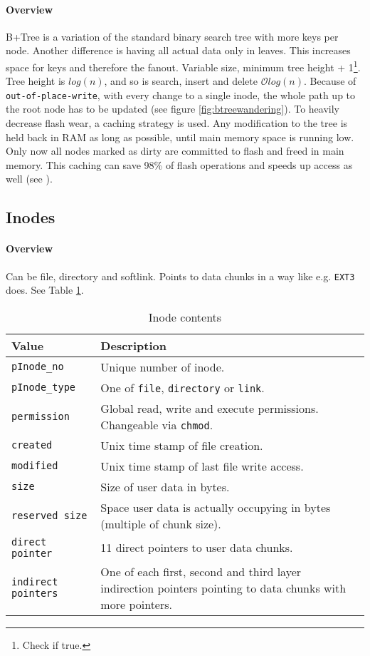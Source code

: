 \paragraph{Overview}
B+Tree is a variation of the standard binary search tree with more keys per node. Another difference is having all actual data only in leaves. This increases space for keys and therefore the fanout. Variable size, minimum tree height + 1\footnote{Check if true.}. Tree height is $log(n)$, and so is search, insert and delete $\mathcal{O}log(n)$. Because of \texttt{out-of-place-write}, with every change to a single inode, the whole path up to the root node has to be updated (see figure \ref{fig:btreewandering}). To heavily decrease flash wear, a caching strategy is used. Any modification to the tree is held back in RAM as long as possible, until main memory space is running low. Only now all nodes marked as dirty are committed to flash and freed in main memory. This caching can save 98\% of flash operations and speeds up access as well (see ).

\subsection{Inodes}
\label{inode}
\paragraph{Overview}
Can be file, directory and softlink. Points to data chunks in a way like e.g. \texttt{EXT3} does. See Table \ref{tab:pinode}.
\begin{table}[htbp]
\caption{Inode contents}
\label{tab:pinode}
\begin{tabularx}{\textwidth}{lp{11cm}p{2.5cm}}
\toprule
Value & Description\\
\midrule
\texttt{pInode\_no} & Unique number of inode. \\
\texttt{pInode\_type} & One of \texttt{file}, \texttt{directory} or \texttt{link}.\\
\texttt{permission} & Global read, write and execute permissions. Changeable via \texttt{chmod}.\\
\texttt{created} & Unix time stamp of file creation.\\
\texttt{modified} & Unix time stamp of last file write access.\\
\texttt{size} & Size of user data in bytes. \\
\texttt{reserved size} & Space user data is actually occupying in bytes (multiple of chunk size).\\
\texttt{direct pointer} & 11 direct pointers to user data chunks.\\
\texttt{indirect pointers} & One of each first, second and third layer indirection pointers pointing to data chunks with more pointers.\\
\bottomrule
\end{tabularx}
\end{table} 


